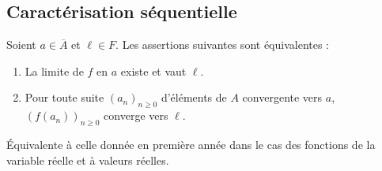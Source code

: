 \documentclass[a4paper,10pt]{report}
\begin{document}
\subsection{Caractérisation séquentielle}

\begin{Proposition}{} Soient $a \in \overline{A}$ et $\ell \in F$. Les assertions suivantes sont équivalentes :

\begin{enumerate}
\item La limite de $f$ en $a$ existe et vaut $\ell$.
\item Pour toute suite $(a_n)_{n \geq 0}$ d'éléments de $A$ convergente vers $a$, $(f(a_n))_{n \geq 0}$ converge vers $\ell$.
\end{enumerate}
\end{Proposition}

\begin{Demonstration}{} Équivalente à celle donnée en première année dans le cas des fonctions de la variable réelle et à valeurs réelles.
\end{Demonstration}

%
%
%
%
%
\end{document}
